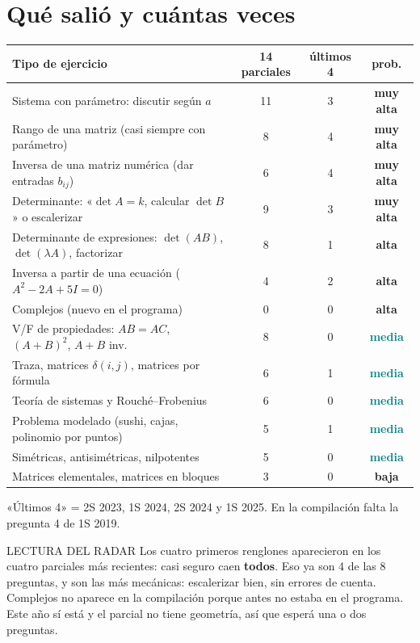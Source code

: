 \section{Qué salió y cuántas veces}
{\small
\renewcommand{\arraystretch}{1.25}
\begin{tabularx}{\linewidth}{@{}Xccc@{}}
\toprule
\textbf{Tipo de ejercicio} & \textbf{14 parciales} & \textbf{últimos 4} & \textbf{prob.}\\
\midrule
Sistema con parámetro: discutir según $a$ & 11 & 3 & \textcolor{rojo}{\textbf{muy alta}}\\
Rango de una matriz (casi siempre con parámetro) & 8 & 4 & \textcolor{rojo}{\textbf{muy alta}}\\
Inversa de una matriz numérica (dar entradas $b_{ij}$) & 6 & 4 & \textcolor{rojo}{\textbf{muy alta}}\\
Determinante: «$\det A=k$, calcular $\det B$» o escalerizar & 9 & 3 & \textcolor{rojo}{\textbf{muy alta}}\\
Determinante de expresiones: $\det(AB)$, $\det(\lambda A)$, factorizar & 8 & 1 & \textcolor{naranja}{\textbf{alta}}\\
Inversa a partir de una ecuación ($A^2-2A+5I=0$) & 4 & 2 & \textcolor{naranja}{\textbf{alta}}\\
Complejos (nuevo en el programa) & 0 & 0 & \textcolor{naranja}{\textbf{alta}}\\
V/F de propiedades: $AB=AC$, $(A+B)^2$, $A+B$ inv. & 8 & 0 & \textcolor{teal}{\textbf{media}}\\
Traza, matrices $\delta(i,j)$, matrices por fórmula & 6 & 1 & \textcolor{teal}{\textbf{media}}\\
Teoría de sistemas y Rouché--Frobenius & 6 & 0 & \textcolor{teal}{\textbf{media}}\\
Problema modelado (sushi, cajas, polinomio por puntos) & 5 & 1 & \textcolor{teal}{\textbf{media}}\\
Simétricas, antisimétricas, nilpotentes & 5 & 0 & \textcolor{teal}{\textbf{media}}\\
Matrices elementales, matrices en bloques & 3 & 0 & \textcolor{suave}{\textbf{baja}}\\
\bottomrule
\end{tabularx}}

{\footnotesize\color{suave}«Últimos 4» = 2S 2023, 1S 2024, 2S 2024 y 1S 2025. En la compilación falta la pregunta 4 de 1S 2019.\par}

\begin{tip}{LECTURA DEL RADAR}
Los cuatro primeros renglones aparecieron en los cuatro parciales más recientes: casi seguro caen \textbf{todos}. Eso ya son 4 de las 8 preguntas, y son las más mecánicas: escalerizar bien, sin errores de cuenta.\\[2pt]
Complejos no aparece en la compilación porque antes no estaba en el programa. Este año sí está y el parcial no tiene geometría, así que esperá una o dos preguntas.
\end{tip}

